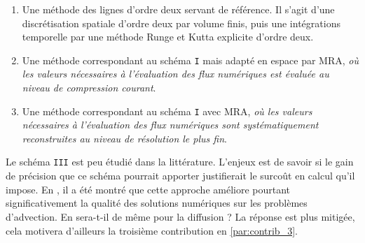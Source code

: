 \begin{enumerate}
    \renewcommand{\labelenumi}{\Roman{enumi}.}
    \item Une méthode des lignes d'ordre deux servant de référence. Il s'agit d'une discrétisation spatiale d'ordre deux par volume finis, 
    puis une intégrations temporelle par une méthode Runge et Kutta explicite d'ordre deux.
    \item Une méthode correspondant au schéma \texttt{I} mais adapté en espace par MRA, \emph{où les valeurs nécessaires à l'évaluation des flux numériques 
    est évaluée au niveau de compression courant}.
    \item Une méthode correspondant au schéma \texttt{I} avec MRA, \emph{où les valeurs nécessaires à l'évaluation des flux numériques 
    sont systématiquement reconstruites au niveau de résolution le plus fin}.
\end{enumerate}
Le schéma \texttt{III} est peu étudié dans la littérature.
L'enjeux est de savoir si le gain de précision que ce schéma pourrait apporter justifierait le surcoût en calcul qu'il impose.
En \cite{belloti_et_al_2025}, il a été montré que cette approche améliore pourtant significativement la qualité des solutions numériques sur les problèmes d'advection.
En sera-t-il de même pour la diffusion ? La réponse est plus mitigée, cela motivera d'ailleurs la troisième contribution en \ref{par:contrib_3}.